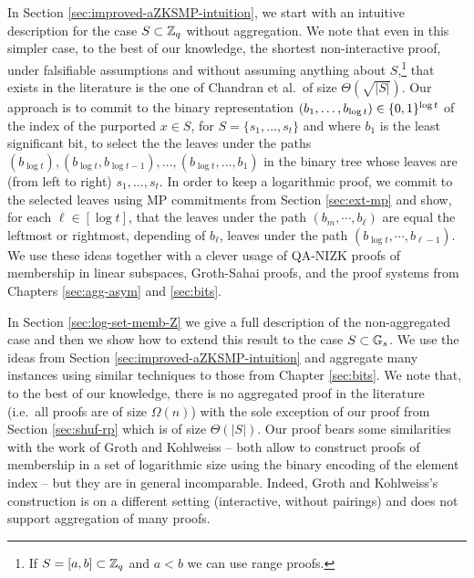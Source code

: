 In Section \ref{sec:improved-aZKSMP-intuition}, we start with an intuitive description for the case $S\subset\mathbb{Z}_q$ without aggregation. We note that even in this simpler case, to the best of our knowledge, the shortest non-interactive proof, under falsifiable assumptions and without assuming anything about $S$,\footnote{If $S=[a,b]\subset\mathbb{Z}_q$ and $a<b$ we can use range proofs.} that exists in the literature is the one of Chandran et al.~of size $\Theta(\sqrt{|S|})$.
Our approach is to commit to the binary representation $(b_1,\ldots,b_{\log t})\in\{0,1\}^{\log t}$ of the index of the purported $x\in S$, for $S=\{s_1,\ldots,s_t\}$ and where $b_1$ is the least significant bit, to select the the leaves under the paths $(b_{\log t}),(b_{\log t},b_{\log t-1}),\ldots,(b_{\log t},\ldots, b_1)$ in the binary tree whose leaves are (from left to right) $s_1,\ldots,s_t$. In order to keep a logarithmic proof, we commit to the selected leaves using MP commitments from Section \ref{sec:ext-mp} and show, for each $\ell\in[\log t]$, that the leaves under the path $(b_m,\cdots, b_{\ell})$ are equal the leftmost or rightmost, depending of $b_\ell$, leaves under the path $(b_{\log t},\cdots, b_{\ell-1})$. We use these ideas together with a clever usage of QA-NIZK proofs of membership in linear subspaces, Groth-Sahai proofs, and the proof systems from Chapters \ref{sec:agg-asym} and \ref{sec:bits}.

In Section \ref{sec:log-set-memb-Z} we give a full description of the non-aggregated case and then we show how to extend this result to the case $S\subset\mathbb{G}_s$. We use the ideas from Section \ref{sec:improved-aZKSMP-intuition} and aggregate many instances using similar techniques to those from Chapter \ref{sec:bits}. We note that, to the best of our knowledge, there is no aggregated proof in the literature (i.e.~all proofs are of size $\Omega(n)$) with the sole exception of our proof from Section \ref{sec:shuf-rp} which is of size $\Theta(|S|)$.  
Our proof bears some similarities with the work of Groth and Kohlweiss \cite{EC:GroKoh15} -- both allow to construct proofs of membership in a set of logarithmic size using the binary encoding of the element index -- but they are in general incomparable. Indeed, Groth and Kohlweiss's construction is on a different setting (interactive, without pairings) and does not support aggregation of many proofs.

